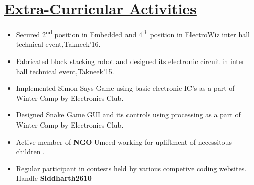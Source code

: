 \documentclass{article}
\begin{document}
\section*{\underline{Extra-Curricular Activities}}
\begin{itemize}
\item Secured 2\textsuperscript{nd} position in Embedded and 4\textsuperscript{th} position in ElectroWiz inter hall technical event,Takneek'16.
\item Fabricated block stacking robot and designed its electronic circuit in inter hall technical event,Takneek'15.
\item Implemented Simon Says Game using basic electronic IC's as a part of Winter Camp by Electronics Club.
\item Designed Snake Game GUI and its controls using processing as a part of Winter Camp by Electronics Club.  
\item Active member of \textbf{NGO} Umeed working for upliftment of necessitous children .
\item Regular participant in contests held by various competive coding websites. Handle-\textbf{Siddharth2610}



\end{itemize} 
\end{document}
